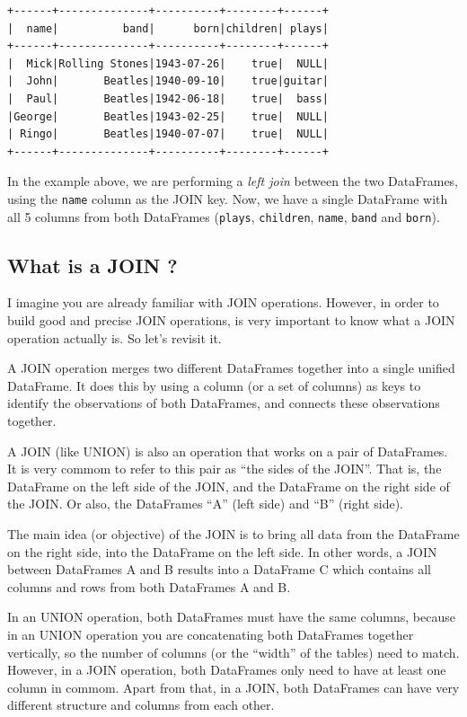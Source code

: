 \documentclass[
  11pt,
  letterpaper,
  DIV=11,
  numbers=noendperiod]{scrreprt}
\begin{document}
\begin{verbatim}
+------+--------------+----------+--------+------+
|  name|          band|      born|children| plays|
+------+--------------+----------+--------+------+
|  Mick|Rolling Stones|1943-07-26|    true|  NULL|
|  John|       Beatles|1940-09-10|    true|guitar|
|  Paul|       Beatles|1942-06-18|    true|  bass|
|George|       Beatles|1943-02-25|    true|  NULL|
| Ringo|       Beatles|1940-07-07|    true|  NULL|
+------+--------------+----------+--------+------+
\end{verbatim}

In the example above, we are performing a \emph{left join} between the
two DataFrames, using the \texttt{name} column as the JOIN key. Now, we
have a single DataFrame with all 5 columns from both DataFrames
(\texttt{plays}, \texttt{children}, \texttt{name}, \texttt{band} and
\texttt{born}).

\subsection{What is a JOIN ?}\label{what-is-a-join}

I imagine you are already familiar with JOIN operations. However, in
order to build good and precise JOIN operations, is very important to
know what a JOIN operation actually is. So let's revisit it.

A JOIN operation merges two different DataFrames together into a single
unified DataFrame. It does this by using a column (or a set of columns)
as keys to identify the observations of both DataFrames, and connects
these observations together.

A JOIN (like UNION) is also an operation that works on a pair of
DataFrames. It is very commom to refer to this pair as ``the sides of
the JOIN''. That is, the DataFrame on the left side of the JOIN, and the
DataFrame on the right side of the JOIN. Or also, the DataFrames ``A''
(left side) and ``B'' (right side).

The main idea (or objective) of the JOIN is to bring all data from the
DataFrame on the right side, into the DataFrame on the left side. In
other words, a JOIN between DataFrames A and B results into a DataFrame
C which contains all columns and rows from both DataFrames A and B.

In an UNION operation, both DataFrames must have the same columns,
because in an UNION operation you are concatenating both DataFrames
together vertically, so the number of columns (or the ``width'' of the
tables) need to match. However, in a JOIN operation, both DataFrames
only need to have at least one column in commom. Apart from that, in a
JOIN, both DataFrames can have very different structure and columns from
each other.
\end{document}

